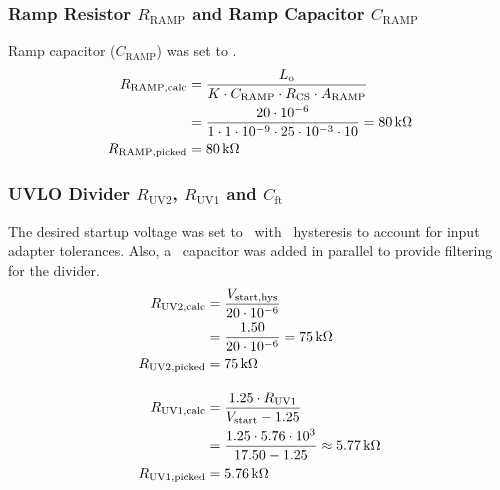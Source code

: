 \subsubsection{Ramp Resistor \texorpdfstring{$R_\mathrm{RAMP}$}{Rramp} and Ramp Capacitor \texorpdfstring{$C_\mathrm{RAMP}$}{Cramp}}
Ramp capacitor ($C_\mathrm{RAMP}$) was set to \uoneCrampSI.
\begin{align}
    R_\mathrm{RAMP,calc}   &= \frac{L_\mathrm{o}}{K \cdot C_\mathrm{RAMP} \cdot R_\mathrm{CS} \cdot A_\mathrm{RAMP}} \nonumber\\
                           &= \frac{20 \cdot 10^{-6}}{1 \cdot 1 \cdot 10^{-9} \cdot 25 \cdot 10^{-3} \cdot 10} = \qty{80}{\kilo\ohm} \nonumber\\
    R_\mathrm{RAMP,picked} &= \qty{80}{\kilo\ohm}
\end{align}

\subsubsection{UVLO Divider \texorpdfstring{$R_\mathrm{UV2}$}{Ruv2}, \texorpdfstring{$R_\mathrm{UV1}$}{Ruv1} and \texorpdfstring{$C_\mathrm{ft}$}{Cft}}
The desired startup voltage was set to \uoneVstartSI\ with \uoneVstartHysSI\ hysteresis to account for input adapter tolerances. 
Also, a \uoneCftSI\ capacitor was added in parallel to provide filtering for the divider.
\begin{align}
    R_\mathrm{UV2,calc}   &= \frac{V_\mathrm{start,hys}}{20 \cdot 10^{-6}} \nonumber\\
                          &= \frac{1.50}{20 \cdot 10^{-6}} = \qty{75}{\kilo\ohm} \nonumber\\
    R_\mathrm{UV2,picked} &= \qty{75}{\kilo\ohm} \\[1em]
    R_\mathrm{UV1,calc}   &= \frac{1.25 \cdot R_\mathrm{UV1}}{V_\mathrm{start} - 1.25} \nonumber\\
                          &= \frac{1.25 \cdot 5.76 \cdot 10^{3}}{17.50 - 1.25} \approx \qty{5.77}{\kilo\ohm} \nonumber\\
    R_\mathrm{UV1,picked} &= \qty{5.76}{\kilo\ohm}
\end{align}